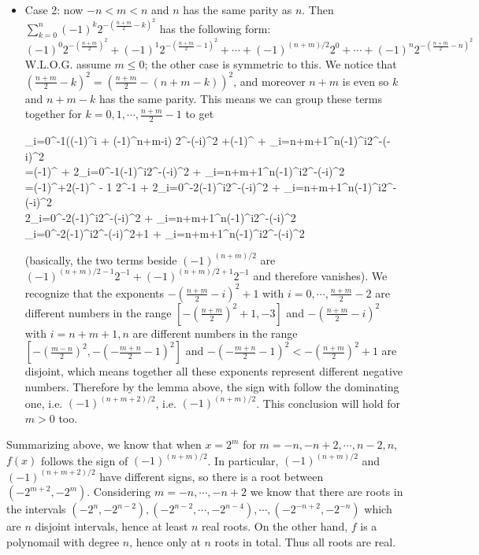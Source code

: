 \documentclass[11pt,a4paper]{article}
\newcommand{\<}{\langle}
\renewcommand{\>}{\rangle}
\newcommand{\dsum}{\displaystyle\sum}
\begin{document}
\begin{enumerate}
\begin{itemize}
		\item Case 2: now $-n<m<n$ and $n$ has the same parity as $n$. 
		Then $\displaystyle\sum_{k=0}^{n} (-1)^k 2^{- (\frac{n+m}{2}-k)^2}$ has the following form: 
		\[
		(-1)^0 2^{-(\frac{n+m}{2})^2} + (-1)^1 2^{-(\frac{n+m}{2} - 1)^2} +\cdots + (-1)^{(n+m)/2}2^0 + \cdots + (-1)^n 2^{-(\frac{n+m}{2} - n)^2} 
		\]
		W.L.O.G. assume $m\le 0$; the other case is symmetric to this. We notice that $(\frac{n+m}{2} - k)^2 = (\frac{n+m}{2} - (n+m -k))^2$, and moreover $n+m$ is even so $k$ and $n+m-k$ has the same parity. This means we can group these terms together for $k=0, 1, \cdots , \frac{n+m}{2}-1$ to get 
		\begin{flalign*}
			\dsum_{i=0}^{-1}((-1)^i  + (-1)^{n+m-i}) 2^{-(-i)^2}
			+(-1)^{}
			+ \dsum_{i=n+m+1}^{n}(-1)^{i}2^{-(-i)^2}
			\\=(-1)^{} + 2\dsum_{i=0}^{-1}(-1)^i2^{-(-i)^2}
			+ \dsum_{i=n+m+1}^{n}(-1)^{i}2^{-(-i)^2}
			\\=(-1)^{}+2(-1)^{ - 1} 2^{-1} + 2\dsum_{i=0}^{-2}(-1)^i2^{-(-i)^2}
			+ \dsum_{i=n+m+1}^{n}(-1)^{i}2^{-(-i)^2}
			\\2\dsum_{i=0}^{-2}(-1)^i2^{-(-i)^2}
			+ \dsum_{i=n+m+1}^{n}(-1)^{i}2^{-(-i)^2}
			\\\dsum_{i=0}^{-2}(-1)^i2^{-(-i)^2+1}
			+ \dsum_{i=n+m+1}^{n}(-1)^{i}2^{-(-i)^2}
		\end{flalign*}
		(basically, the two terms beside $(-1)^{(n+m)/2}$ are $(-1)^{(n+m)/2-1}2^{-1}+(-1)^{(n+m)/2+1}2^{-1}$ and therefore vanishes). 
		We recognize that the exponents $-(\frac{n+m}{2}-i)^2+1$ with $i=0, \cdots , \frac{n+m}{2}-2$ are different numbers in the range $[-(\frac{n+m}{2})^2+1, -3]$ and $-(\frac{n+m}{2}-i)^2$ with $i=n+m+1, n$ are different numbers in the range $[-(\frac{m-n}{2})^2, -(-\frac{m+n}{2}-1)^2]$ and $-(-\frac{m+n}{2}-1)^2 < -(\frac{n+m}{2})^2+1$ are disjoint, which means together all these exponents represent different negative numbers. Therefore by the lemma above, the sign with follow the dominating one, i.e. $(-1)^{(n+m+2)/2}$, i.e. $(-1)^{(n+m)/2}$. This conclusion will hold for $m>0$ too. 
	\end{itemize}
	Summarizing above, we know that when $x=2^{m}$ for $m=-n, -n+2, \cdots , n-2, n$, $f(x)$ follows the sign of $(-1)^{(n+m)/2}$. In particular, $(-1)^{(n+m)/2}$ and $(-1)^{(n+m+2)/2}$ have different signs, so there is a root between $(-2^{m+2}, -2^m)$. 
	Considering $m=-n, \cdots , -n+2$ we know that there are roots in the intervals 
	$(-2^{n}, -2^{n-2}), (-2^{n-2}, \cdots , -2^{n-4}), \cdots , (-2^{-n+2}, -2^{-n})$ which are $n$ disjoint intervals, hence at least $n$ real roots. On the other hand, $f$ is a polynomail with degree $n$, hence only at $n$ roots in total. Thus all roots are real. 
    
\end{enumerate}
\end{document}
